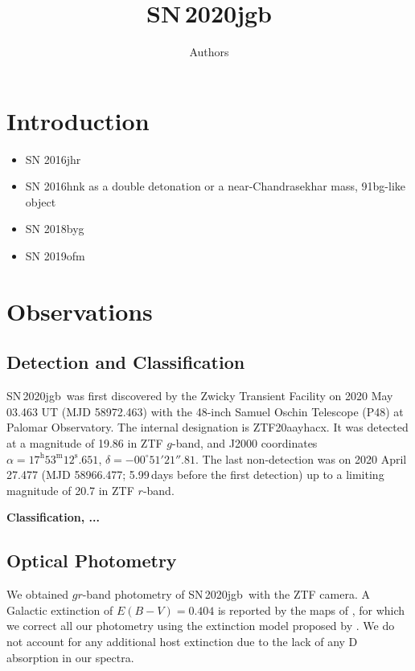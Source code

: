 \documentclass[twocolumn]{aastex631}
\newcommand\sn{SN\,2020jgb}
\begin{document}
\title{\sn}

\author{Authors}

\begin{abstract}

\end{abstract}


\section{Introduction} \label{sec:intro}
\begin{itemize}
    \item SN 2016jhr \citep{jiang_16jhr_2017}
    \item SN 2016hnk as a double detonation \citep{jacobson-galan_16hnk_2020} or a near-Chandrasekhar mass, 91bg-like object \citep{galbany_16hnk_2019}
    \item SN 2018byg \citep{de_18byg_2019}
    \item SN 2019ofm \citep{de_Ca_rich_2020}
\end{itemize}
\section{Observations} \label{sec:obs}
\subsection{Detection and Classification}
\sn\ was first discovered by the Zwicky Transient Facility \citep[ZTF;][]{ZTF2019a,ZTF2019b} on 2020 May 03.463 UT (MJD 58972.463) with the 48-inch Samuel Oschin Telescope (P48) at Palomar Observatory. The internal designation is ZTF20aayhacx. It was detected at a magnitude of 19.86 in ZTF $g$-band, and J2000 coordinates $\alpha=17^\mathrm{h}53^\mathrm{m}12^\mathrm{s}.651$, $\delta=-00^\circ51'21''.81$. The last non-detection was on 2020 April 27.477 (MJD 58966.477; 5.99\,days before the first detection) up to a limiting magnitude of 20.7 in ZTF $r$-band.

\textbf{Classification, ...}

\subsection{Optical Photometry}
We obtained $gr$-band photometry of \sn\ with the ZTF camera. A Galactic extinction of $E(B-V)=0.404$ is reported by the maps of \citet{Schlafly2011}, for which we correct all our photometry using the extinction model proposed by \citet{Fitzpatrick1999}. We do not account for any additional host extinction due to the lack of any  D absorption in our spectra.
\end{document}

